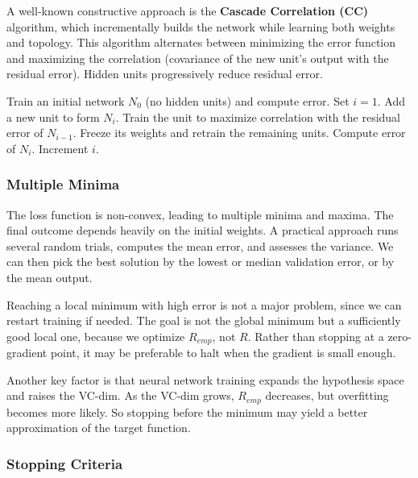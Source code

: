 A well-known constructive approach is the \textbf{Cascade Correlation (CC)} algorithm, which incrementally builds the network while learning both weights and topology. This algorithm alternates between minimizing the error function and maximizing the correlation (covariance of the new unit's output with the residual error). Hidden units progressively reduce residual error.

\begin{algorithm}
\caption{Cascade Correlation Algorithm}
\begin{algorithmic}[1]
    \State Train an initial network $N_0$ (no hidden units) and compute error.
        \State Set $i = 1$.
        \Repeat 
            \State Add a new unit to form $N_i$.
            \State Train the unit to maximize correlation with the residual error of $N_{i-1}$.
            \State Freeze its weights and retrain the remaining units.
            \State Compute error of $N_i$.
            \State Increment $i$.
    \EndIf
\end{algorithmic}
\end{algorithm}

\subsubsection{Multiple Minima}

The loss function is non-convex, leading to multiple minima and maxima. The final outcome depends heavily on the initial weights. A practical approach runs several random trials, computes the mean error, and assesses the variance. We can then pick the best solution by the lowest or median validation error, or by the mean output.

Reaching a local minimum with high error is not a major problem, since we can restart training if needed. The goal is not the global minimum but a sufficiently good local one, because we optimize $R_{emp}$, not $R$. Rather than stopping at a zero-gradient point, it may be preferable to halt when the gradient is small enough.

Another key factor is that neural network training expands the hypothesis space and raises the VC-dim. As the VC-dim grows, $R_{emp}$ decreases, but overfitting becomes more likely. So stopping before the minimum may yield a better approximation of the target function.

\subsubsection{Stopping Criteria}

